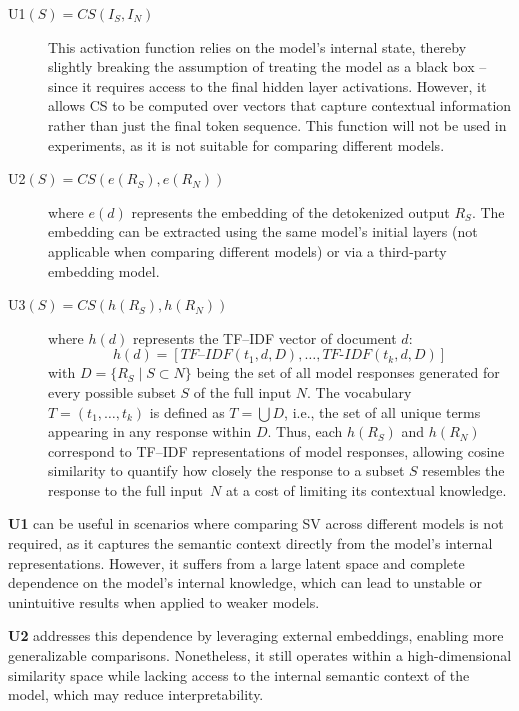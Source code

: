 \begin{description}
    \item[U1$(S) = CS(I_S, I_N)$]

    This activation function relies on the model’s internal state, thereby slightly breaking the assumption of treating the model as a black box -- since it requires access to the final hidden layer activations. However, it allows CS to be computed over vectors that capture contextual information rather than just the final token sequence. This function will not be used in experiments, as it is not suitable for comparing different models.

    \item[U2$(S) = CS(e(R_S), e(R_N))$]

    where $e(d)$ represents the embedding of the detokenized output $R_S$. The embedding can be extracted using the same model’s initial layers (not applicable when comparing different models) or via a third-party embedding model.

    \item[U3$(S) = CS(h(R_S), h(R_N))$]

        where $h(d)$ represents the TF–IDF vector of document $d$:
    \[
        h(d) = [\textit{TF–IDF}(t_1, d, D), \dots, \textit{TF-IDF}(t_k, d, D)]
    \]
    with $D = \{R_S \mid S \subset N\}$ being the set of all model responses generated for every possible subset $S$ of the full input $N$.
    The vocabulary $T = (t_1, \dots, t_k)$ is defined as $T = \bigcup D$, i.e., the set of all unique terms appearing in any response within $D$.
    Thus, each $h(R_S)$ and $h(R_N)$ correspond to TF–IDF representations of model responses, allowing cosine similarity to quantify how closely the response to a subset $S$ resembles the response to the full input~$N$ at a cost of limiting its contextual knowledge.
\end{description}

\textbf{U1} can be useful in scenarios where comparing SV across different models is not required, as it captures the semantic context directly from the model’s internal representations. However, it suffers from a large latent space and complete dependence on the model’s internal knowledge, which can lead to unstable or unintuitive results when applied to weaker models.

\textbf{U2} addresses this dependence by leveraging external embeddings, enabling more generalizable comparisons. Nonetheless, it still operates within a high-dimensional similarity space while lacking access to the internal semantic context of the model, which may reduce interpretability.

